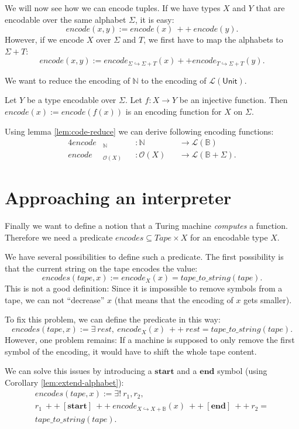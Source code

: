 \documentclass{psartcl}
\newcommand{\app}{~ ++ ~}
\newcommand{\from}{:}
\renewcommand{\to}{\rightarrow}
\newcommand{\Opt}{\mathcal{O}}
\newcommand{\Bool}{\mathbb{B}}
\newcommand{\Nat}{\mathbb{N}}
\newcommand{\Unit}{\mathsf{Unit}}
\newcommand{\List}{\mathcal{L}}
\newcommand{\Tau}{T}
\begin{document}
We will now see how we can encode tuples.  If we have types $X$ and $Y$ that are encodable over the same alphabet $\Sigma$, it is easy:
$$encode(x,y) := encode(x) \app encode(y).$$
However, if we encode $X$ over $\Sigma$ and $\Tau$, we first have to map the alphabets to $\Sigma + \Tau$:
$$encode(x,y) := encode_{\Sigma \hookrightarrow \Sigma + \Tau}(x) ++ encode_{\Tau \hookrightarrow \Sigma + \Tau}(y).$$

We want to reduce the encoding of $\Nat$ to the encoding of $\List(\Unit)$.
\begin{lemma}
  \label{lem:code-reduce}
  Let $Y$ be a type encodable over $\Sigma$.
  Let $f \from X \to Y$ be an injective function.
  Then $encode(x) := encode(f(x))$ is an encoding function for $X$ on $\Sigma$.
\end{lemma}
\begin{corollary}
  Using lemma \ref{lem:code-reduce} we can derive following encoding functions:
  \begin{alignat*}{4}
    encode&_\Nat      &&\from \Nat    &&\to \List(\Bool) \\
    encode&_{\Opt(X)} &&\from \Opt(X) &&\to \List(\Bool + \Sigma).
  \end{alignat*}
\end{corollary}


\section{Approaching an interpreter}

Finally we want to define a notion that a Turing machine \emph{computes} a function.  Therefore we need a predicate $encodes \subseteq Tape \times X$
for an encodable type $X$.

We have several possibilities to define such a predicate.  The first possibility is that the current string on the tape encodes the value:
$$encodes(tape, x) := encode_X(x) = tape\_to\_string(tape).$$
This is not a good definition: Since it is impossible to remove symbols from a tape, we can not ``decrease'' $x$ (that means that the encoding of
$x$ gets smaller).

To fix this problem, we can define the predicate in this way:
$$encodes(tape, x) := \exists~rest,~encode_X(x) \app rest = tape\_to\_string(tape).$$
However, one problem remains:  If a machine is supposed to only remove the first symbol of the encoding, it would have to shift the whole tape
content.

We can solve this issues by introducing a $\mathbf{start}$ and a $\mathbf{end}$ symbol (using Corollary \ref{lem:extend-alphabet}):
\begin{multline*}
  encodes(tape,x) := \exists!~r_1,r_2,~\\
  r_1 \app [\mathbf{start}] \app encode_{X \hookrightarrow X + \Bool}(x) \app [\mathbf{end}] \app r_2 = \\
  tape\_to\_string(tape).
\end{multline*}
\end{document}
